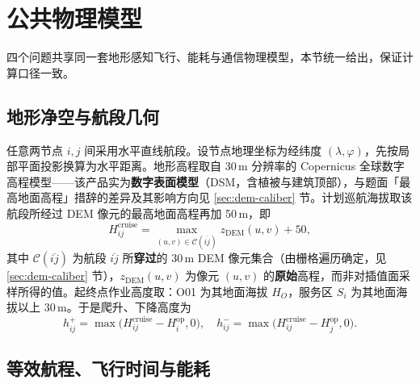 \section{公共物理模型}
\label{sec:physics}

四个问题共享同一套地形感知飞行、能耗与通信物理模型，本节统一给出，保证计算口径一致。

\subsection{地形净空与航段几何}

任意两节点 $i,j$ 间采用水平直线航段。设节点地理坐标为经纬度 $(\lambda,\varphi)$，先按局部平面投影换算为水平距离。地形高程取自 30\,m 分辨率的 Copernicus 全球数字高程模型\cite{copernicus2024dem}——该产品实为\textbf{数字表面模型}（DSM，含植被与建筑顶部），与题面「最高地面高程」措辞的差异及其影响方向见 \ref{sec:dem-caliber} 节。计划巡航海拔取该航段所经过 DEM 像元的最高地面高程再加 50\,m，即
\begin{equation}
	H_{ij}^{\mathrm{cruise}} = \max_{(u,v)\in \mathcal{C}(\overline{ij})} z_{\mathrm{DEM}}(u,v) + 50,
	\label{eq:cruise-alt}
\end{equation}
其中 $\mathcal{C}(\overline{ij})$ 为航段 $\overline{ij}$ 所\textbf{穿过}的 30\,m DEM 像元集合（由栅格遍历确定，见 \ref{sec:dem-caliber} 节），$z_{\mathrm{DEM}}(u,v)$ 为像元 $(u,v)$ 的\textbf{原始}高程，而非对插值面采样所得的值。起终点作业高度取：O01 为其地面海拔 $H_{O}$，服务区 $S_i$ 为其地面海拔以上 30\,m。于是爬升、下降高度为
\begin{equation}
	h^{+}_{ij}=\max\!\big(H_{ij}^{\mathrm{cruise}}-H_i^{\mathrm{op}},0\big),\quad
	h^{-}_{ij}=\max\!\big(H_{ij}^{\mathrm{cruise}}-H_j^{\mathrm{op}},0\big).
	\label{eq:climb-desc}
\end{equation}

\subsection{等效航程、飞行时间与能耗}

